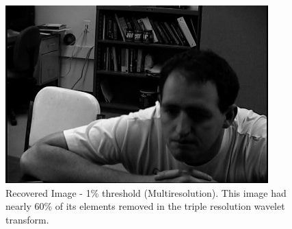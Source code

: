 \begin{figure}[htb]
\begin{center}
\includegraphics [width=4in]{recover3R001.jpg}
\end{center}
\caption{Recovered Image - 1\% threshold (Multiresolution).  This image had nearly 60\% of its elements removed in the triple resolution wavelet transform.   }
\label{recover3R001}
\end{figure}




